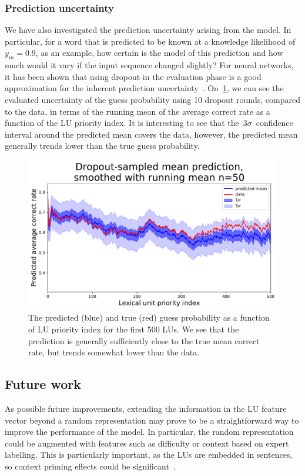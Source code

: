 \subsubsection{Prediction uncertainty}
We have also investigated the prediction uncertainty arising from the model. In particular, for a word that is predicted to be known at a knowledge likelihood of~$y_m=0.9$, as an example, how certain is the model of this prediction and how much would it vary if the input sequence changed slightly? For neural networks, it has been shown that using dropout in the evaluation phase is a good approximation for the inherent prediction uncertainty~\cite{gal2016dropout}. On~\cref{fig:uncertainty}, we can see the evaluated uncertainty of the guess probability using 10 dropout rounds, compared to the data, in terms of the running mean of the average correct rate as a function of the LU priority index. It is interesting to see that the~$3\sigma$~confidence interval around the predicted mean covers the data, however, the predicted mean generally trends lower than the true guess probability.

\begin{figure}[ht]
\centering
\includegraphics[width=1.0\linewidth]{figures/lingvist/uncertainty.pdf}
\caption[The sensitivity estimation of the model using dropout sampling.]{The predicted (blue) and true (red) guess probability as a function of LU priority index for the first 500 LUs. We see that the prediction is generally sufficiently close to the true mean correct rate, but trends somewhat lower than the data.}
\label{fig:uncertainty}
\end{figure}

\subsection{Future work}
As possible future improvements, extending the information in the LU feature vector beyond a random representation may prove to be a straightforward way to improve the performance of the model. In particular, the random representation could be augmented with features such as difficulty or context based on expert labelling. This is particularly important, as the LUs are embedded in sentences, so context priming effects could be significant~\cite{elgort2011deliberate}.

